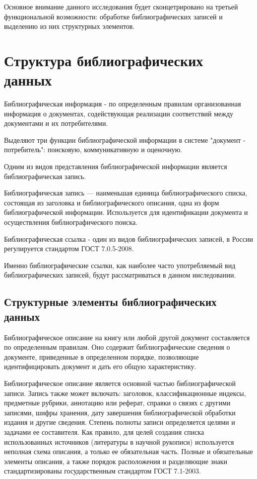 Основное внимание данного исследования будет сконцетрировано на третьей функциональной возможности: обработке библиографических записей и выделению из них структурных элементов.

\section{Структура библиографических данных}

Библиографическая информация - по определенным правилам организованная информация о документах, содействующая реализации соответствий между документами и их потребителями.

Выделяют три функции библиографической информации в системе "документ - потребитель": поисковую, коммуникативную и оценочную.

Одним из видов представления библиографической информации является библиографическая запись.

Библиографическая запись — наименьшая единица библиографического списка, состоящая из заголовка и библиографического описания, одна из форм библиографической информации. Используется для идентификации документа и осуществления библиографического поиска.

Библиографическая ссылка - один из видов библиографических записей, в России регулируется стандартом ГОСТ 7.0.5-2008.

Именно библиографические ссылки, как наиболее часто употребляемый вид библиографических записей, будут рассматриваться в данном ииследовании.

\subsection{Структурные элементы библиографических данных}
Библиографическое описание на книгу или любой другой документ составляется по определенным правилам. Оно содержит библиографические сведения о документе, приведенные в определенном порядке, позволяющие идентифицировать документ и дать его общую характеристику.

Библиографическое описание является основной частью библиографической записи. Запись также может включать: заголовок, классификационные индексы, предметные рубрики, аннотацию или реферат, справки о связях с другими записями, шифры хранения, дату завершения библиографической обработки издания и другие сведения. Степень полноты записи определяется целями и задачами ее составителя. Как правило, для целей создания списка использованных источников (литературы в научной рукописи) используется неполная схема описания, а только ее обязательная часть. Полные и обязательные элементы описания, а также порядок расположения и разделяющие знаки стандартизированы государственным стандартом ГОСТ 7.1-2003.

